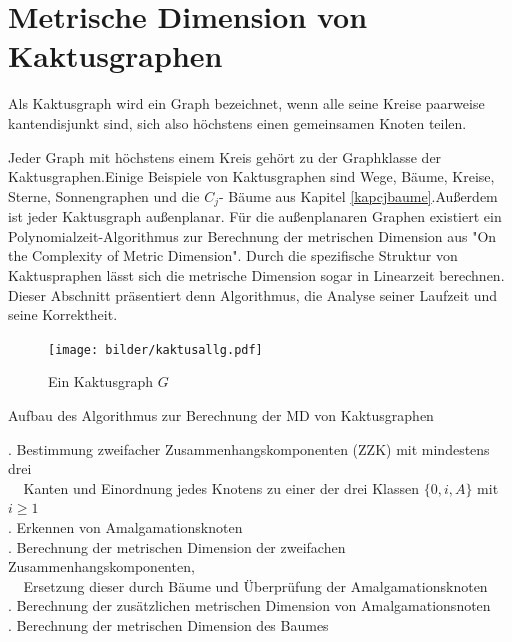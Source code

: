 \chapter{Metrische Dimension von Kaktusgraphen}
\label{kapkaktus}
\begin{defi}
Als Kaktusgraph wird ein Graph bezeichnet, wenn alle seine Kreise paarweise kantendisjunkt sind, sich also höchstens einen gemeinsamen Knoten teilen.
\end{defi}
Jeder Graph mit höchstens einem Kreis gehört zu der Graphklasse der Kaktusgraphen.\newline Einige Beispiele von Kaktusgraphen sind Wege, Bäume, Kreise, Sterne, Sonnengraphen und die $C_j$- Bäume aus Kapitel \ref{kapcjbaume}.\newline Außerdem ist jeder Kaktusgraph außenplanar. Für die außenplanaren Graphen existiert ein Polynomialzeit-Algorithmus zur Berechnung der metrischen Dimension aus "On the Complexity of Metric Dimension"\cite{aussenplanar}. Durch die spezifische Struktur von Kaktuspraphen lässt sich die metrische Dimension sogar in Linearzeit berechnen. Dieser Abschnitt präsentiert denn Algorithmus, die Analyse seiner Laufzeit und seine Korrektheit.
\begin{figure}[h!]
		\centering
 		 \texttt{[image: bilder/kaktusallg.pdf]}
   \caption{Ein Kaktusgraph $G$}
   \label{gk}
  	 \end{figure}
  	 \vspace{-2mm}
\begin{algorithm}
\caption{Aufbau des Algorithmus zur Berechnung der MD von Kaktusgraphen}
\begin{algorithmic}
\vspace{2mm}
\vspace{2mm}
\vspace{2mm}
. Bestimmung zweifacher Zusammenhangskomponenten (ZZK) mit mindestens drei\\$\;\;\;\;$Kanten und Einordnung jedes Knotens zu einer der drei Klassen $\{0,i,A\}$ mit $i \geq 1$\\
\vspace{2mm}
. Erkennen von Amalgamationsknoten\\
\vspace{2mm}
. Berechnung der metrischen Dimension der zweifachen Zusammenhangskomponenten,\\$\;\;\;\;$Ersetzung dieser durch Bäume und Überprüfung der Amalgamationsknoten\\
\vspace{2mm}
. Berechnung der zusätzlichen metrischen Dimension von Amalgamationsnoten\\
\vspace{2mm}
. Berechnung der metrischen Dimension des Baumes
\vspace{2mm}
\end{algorithmic}
\end{algorithm}
\newpage
